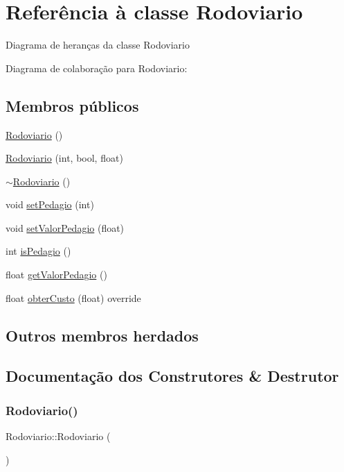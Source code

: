 \hypertarget{classRodoviario}{}\section{Referência à classe Rodoviario}
\label{classRodoviario}


Diagrama de heranças da classe Rodoviario


Diagrama de colaboração para Rodoviario\+:
\subsection*{Membros públicos}
\begin{DoxyCompactItemize}
\item 
\hyperlink{classRodoviario_a91f98005c09609f74f4de02c1907481d}{Rodoviario} ()
\item 
\hyperlink{classRodoviario_a56cdc15643e5d023e2d4c61139ecc16d}{Rodoviario} (int, bool, float)
\item 
\hyperlink{classRodoviario_a11df25b437139f12013adc0d861b7970}{$\sim$\+Rodoviario} ()
\item 
void \hyperlink{classRodoviario_a14273f1bc7d5a0b237846749fbe2221e}{set\+Pedagio} (int)
\item 
void \hyperlink{classRodoviario_a920f911349153ac9e95df101fe1afe0c}{set\+Valor\+Pedagio} (float)
\item 
int \hyperlink{classRodoviario_aa3c5c3b649b9aa4bde43e2154b940c89}{is\+Pedagio} ()
\item 
float \hyperlink{classRodoviario_a4c62b1d1a5e924a60b185b2023034943}{get\+Valor\+Pedagio} ()
\item 
float \hyperlink{classRodoviario_a907ec064fb54db8a05b480cf58c5fe57}{obter\+Custo} (float) override
\end{DoxyCompactItemize}
\subsection*{Outros membros herdados}


\subsection{Documentação dos Construtores \& Destrutor}
\mbox{\label{classRodoviario_a91f98005c09609f74f4de02c1907481d}} 
\subsubsection{\texorpdfstring{Rodoviario()}{Rodoviario()}\hspace{0.1cm}{\footnotesize\ttfamily [1/2]}}
{\footnotesize\ttfamily Rodoviario\+::\+Rodoviario (\begin{DoxyParamCaption}{ }\end{DoxyParamCaption})}

